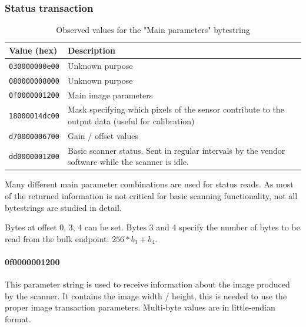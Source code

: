 \documentclass{article}
\begin{document}
\subsubsection{Status transaction}
\label{appendix_status}
\begin{table}[H]
  \caption{Observed values for the "Main parameters" bytestring}
  \centering
  \begin{tabularx}{\textwidth}{l | X}
    Value (hex) & Description \\ \hline
    {\tt 030000000e00} & Unknown purpose \\
    {\tt 080000008000} & Unknown purpose \\
    {\tt 0f0000001200} & Main image parameters \\
    {\tt 18000014dc00} & Mask specifying which pixels of the sensor contribute to the
                         output data (useful for calibration) \\
    {\tt d70000006700} & Gain / offset values \\
    {\tt dd0000001200} & Basic scanner status. Sent in regular intervals by the
                                               vendor software while the scanner is idle. \\

  \end{tabularx}
  \label{table:read_param}
\end{table}

Many different main parameter combinations are used for status reads. As most of the returned
information is not critical for basic scanning functionality, not all bytestrings are
studied in detail.

Bytes at offset 0, 3, 4 can be set. Bytes 3 and 4 specify the number of bytes to
be read from the bulk endpoint: $256 * b_3 + b_4$.

\paragraph{0f0000001200}

This parameter string is used to receive information about the image produced by the scanner.
It contains the image width / height, this is needed to use the proper image transaction
parameters. Multi-byte values are in little-endian format.
\end{document}
